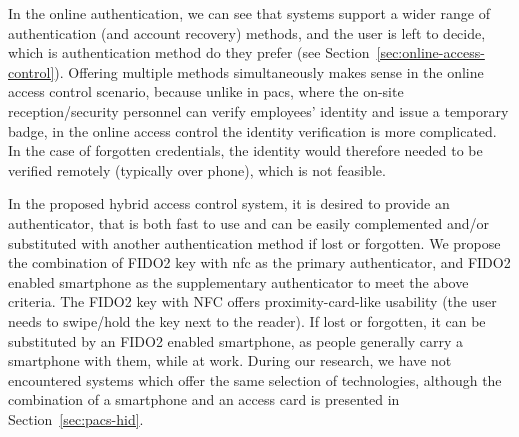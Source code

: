 In the online authentication, we can see that systems support a wider range of authentication (and account recovery) methods, and the user is left to decide, which is authentication method do they prefer (see Section~\ref{sec:online-access-control}). Offering multiple methods simultaneously makes sense in the online access control scenario, because unlike in \acrshort{pacs}, where the on-site reception/security personnel can verify employees' identity and issue a temporary badge, in the online access control the identity verification is more complicated. In the case of forgotten credentials, the identity would therefore needed to be verified remotely (typically over phone), which is not feasible.

In the proposed hybrid access control system, it is desired to provide an authenticator, that is both fast to use and can be easily complemented and/or substituted with another authentication method if lost or forgotten. We propose the combination of FIDO2 key with \acrshort{nfc} as the primary authenticator, and FIDO2 enabled smartphone as the supplementary authenticator to meet the above criteria. The FIDO2 key with NFC offers proximity-card-like usability (the user needs to swipe/hold the key next to the reader). If lost or forgotten, it can be substituted by an FIDO2 enabled smartphone, as people generally carry a smartphone with them, while at work. During our research, we have not encountered systems which offer the same selection of technologies, although the combination of a smartphone and an access card is presented in Section~\ref{sec:pacs-hid}.




